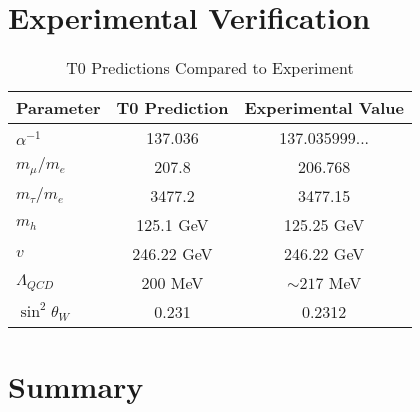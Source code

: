 \documentclass[12pt,a4paper]{article}
\begin{document}
	\section{Experimental Verification}
	
	\begin{table}[H]
		\centering
		\begin{tabular}{lcc}
			\toprule
			\textbf{Parameter} & \textbf{T0 Prediction} & \textbf{Experimental Value} \\
			\midrule
			$\alpha^{-1}$ & 137.036 & 137.035999... \\
			$m_\mu/m_e$ & 207.8 & 206.768 \\
			$m_\tau/m_e$ & 3477.2 & 3477.15 \\
			$m_h$ & 125.1 GeV & 125.25 GeV \\
			$v$ & 246.22 GeV & 246.22 GeV \\
			$\Lambda_{QCD}$ & 200 MeV & $\sim 217$ MeV \\
			$\sin^2\theta_W$ & 0.231 & 0.2312 \\
			\bottomrule
		\end{tabular}
		\caption{T0 Predictions Compared to Experiment}
	\end{table}
	
	\section{Summary}
	
\end{document}
